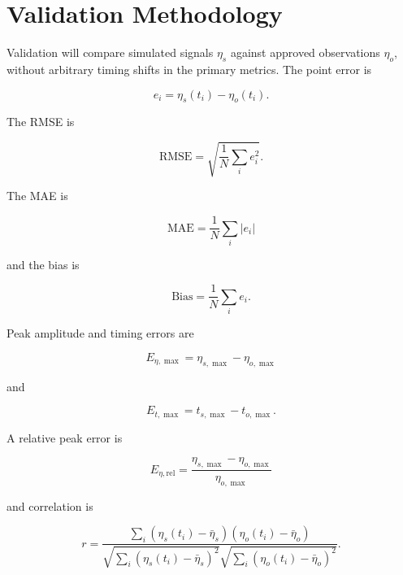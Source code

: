 \section{Validation Methodology}

Validation will compare simulated signals \(\eta_s\) against approved observations \(\eta_o\), without arbitrary timing shifts in the primary metrics. The point error is

\begin{equation}
\label{eq:validation-point-error}
e_i=
\eta_s(t_i)-\eta_o(t_i).
\end{equation}

The RMSE is

\begin{equation}
\label{eq:validation-rmse}
\mathrm{RMSE}
=
\sqrt{
\frac{1}{N}
\sum_i e_i^2
}.
\end{equation}

The MAE is

\begin{equation}
\label{eq:validation-mae}
\mathrm{MAE}
=
\frac{1}{N}
\sum_i|e_i|
\end{equation}

and the bias is

\begin{equation}
\label{eq:validation-bias}
\mathrm{Bias}
=
\frac{1}{N}
\sum_i e_i .
\end{equation}

Peak amplitude and timing errors are

\begin{equation}
\label{eq:validation-peak-amplitude-error}
E_{\eta,\max}
=
\eta_{s,\max}
-
\eta_{o,\max}
\end{equation}

and

\begin{equation}
\label{eq:validation-peak-timing-error}
E_{t,\max}
=
t_{s,\max}
-
t_{o,\max}.
\end{equation}

A relative peak error is

\begin{equation}
\label{eq:validation-relative-peak-error}
E_{\eta,\mathrm{rel}}
=
\frac{\eta_{s,\max}-\eta_{o,\max}}{\eta_{o,\max}}
\end{equation}

and correlation is

\begin{equation}
\label{eq:validation-correlation}
r
=
\frac{\sum_i(\eta_s(t_i)-\bar{\eta}_s)(\eta_o(t_i)-\bar{\eta}_o)}
{\sqrt{\sum_i(\eta_s(t_i)-\bar{\eta}_s)^2}\sqrt{\sum_i(\eta_o(t_i)-\bar{\eta}_o)^2}} .
\end{equation}

